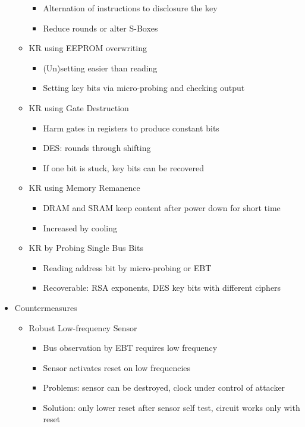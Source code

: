 \documentclass[11pt, paper=a4, twocolumn]{scrartcl}
\begin{document}
\begin{itemize}
\begin{itemize}
\begin{itemize}
							\item Alternation of instructions to disclosure the key
							\item Reduce rounds or alter S-Boxes
						\end{itemize}
					\item KR using EEPROM overwriting
						\begin{itemize}
							\item (Un)setting easier than reading
							\item Setting key bits via micro-probing and checking output
						\end{itemize}
					\item KR using Gate Destruction
						\begin{itemize}
							\item Harm gates in registers to produce constant bits
							\item DES: rounds through shifting
							\item If one bit is stuck, key bits can be recovered
						\end{itemize}
					\item KR using Memory Remanence
						\begin{itemize}
							\item DRAM and SRAM keep content after power down for short time
							\item Increased by cooling
						\end{itemize}
					\item KR by Probing Single Bus Bits
						\begin{itemize}
							\item Reading address bit by micro-probing or EBT
							\item Recoverable: RSA exponents, DES key bits with different ciphers
						\end{itemize}
				\end{itemize}
			\item Countermeasures
				\begin{itemize}
					\item Robust Low-frequency Sensor
						\begin{itemize}
							\item Bus observation by EBT requires low frequency
							\item Sensor activates reset on low frequencies
							\item Problems: sensor can be destroyed, clock under control of attacker
							\item Solution: only lower reset after sensor self test, circuit works only with reset

\end{itemize}
\end{itemize}
\end{itemize}
\end{document}
